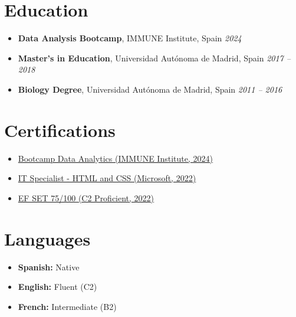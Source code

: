 \documentclass[11pt,a4paper]{article}
\begin{document}
\vspace{1em}

\section*{Education}
\begin{itemize}[leftmargin=0.5cm]
    \item \textbf{Data Analysis Bootcamp}, IMMUNE Institute, Spain \hfill \textit{2024}
    \item \textbf{Master's in Education}, Universidad Autónoma de Madrid, Spain \hfill \textit{2017 – 2018}
    \item \textbf{Biology Degree}, Universidad Autónoma de Madrid, Spain \hfill \textit{2011 – 2016}
\end{itemize}

\vspace{1em}

\section*{Certifications}
\begin{itemize}[leftmargin=0.5cm]
    \item \href{https://www.credential.net/ad14325c-15f7-4a4a-8c27-0969c1ead58c#acc.b7DS18T2}{Bootcamp Data Analytics (IMMUNE Institute, 2024)}
    \item \href{https://www.credly.com/badges/b44395d5-2341-454c-bb2f-4e815e1cf16a/public_url}{IT Specialist - HTML and CSS (Microsoft, 2022)}
    \item \href{https://cert.efset.org/wDUAG4}{EF SET 75/100 (C2 Proficient, 2022)}
\end{itemize}

\vspace{1em}

\section*{Languages}
\begin{itemize}[leftmargin=0.5cm]
    \item \textbf{Spanish:} Native
    \item \textbf{English:} Fluent (C2)
    \item \textbf{French:} Intermediate (B2)
\end{itemize}
\end{document}
